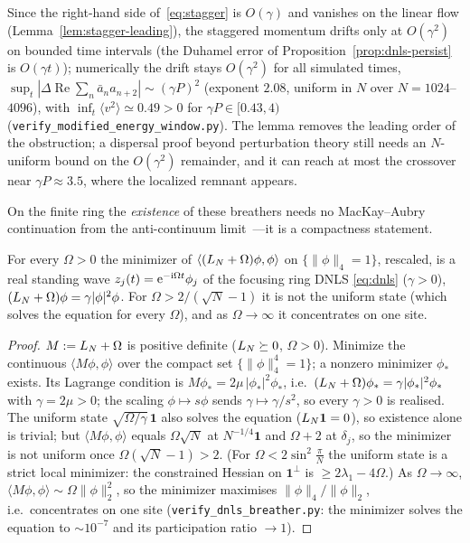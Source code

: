 \noindent Since the right-hand side of~\eqref{eq:stagger} is $O(\gamma)$ and vanishes on the linear flow
(Lemma~\ref{lem:stagger-leading}), the staggered momentum drifts only at $O(\gamma^2)$ on bounded time
intervals (the Duhamel error of Proposition~\ref{prop:dnls-persist} is $O(\gamma t)$); numerically the drift
stays $O(\gamma^2)$ for all simulated times,
$\sup_t|\Delta\!\operatorname{Re}\!\sum_n\bar a_na_{n+2}|\sim(\gamma P)^2$ (exponent $2.08$, uniform in $N$
over $N=1024$--$4096$), with $\inf_t\langle v^2\rangle\simeq0.49>0$ for $\gamma P\in[0.43,4)$
(\texttt{verify\_modified\_energy\_window.py}). The lemma removes the leading order of the obstruction;
a dispersal proof beyond perturbation theory still needs an $N$-uniform bound on the $O(\gamma^2)$ remainder,
and it can reach at most the crossover near $\gamma P\approx3.5$, where the localized remnant appears.

On the finite ring the \emph{existence} of these breathers needs no MacKay--Aubry continuation from the
anti-continuum limit~\cite{MacKayAubry}---it is a compactness statement.

\begin{proposition}\label{prop:breather}
For every $\Omega>0$ the minimizer of $\langle(L_N+\Omega)\phi,\phi\rangle$ on $\{\|\phi\|_4=1\}$, rescaled,
is a real standing wave $z_j(t)=\mathrm{e}^{-\mathrm i\Omega t}\phi_j$ of the focusing ring DNLS \eqref{eq:dnls}
($\gamma>0$), $(L_N+\Omega)\phi=\gamma|\phi|^2\phi$. For $\Omega>2/(\sqrt N-1)$ it is not the uniform state
(which solves the equation for every $\Omega$), and as $\Omega\to\infty$ it concentrates on one site.
\end{proposition}

\begin{proof}
$M:=L_N+\Omega$ is positive definite ($L_N\succeq0$, $\Omega>0$). Minimize the continuous $\langle
M\phi,\phi\rangle$ over the compact set $\{\|\phi\|_4^4=1\}$; a nonzero minimizer $\phi_\ast$ exists. Its
Lagrange condition is $M\phi_\ast=2\mu\,|\phi_\ast|^2\phi_\ast$, i.e.\ $(L_N+\Omega)\phi_\ast=\gamma|\phi_\ast|^2\phi_\ast$
with $\gamma=2\mu>0$; the scaling $\phi\mapsto s\phi$ sends $\gamma\mapsto\gamma/s^2$, so every $\gamma>0$ is
realised. The uniform state $\sqrt{\Omega/\gamma}\,\mathbf 1$ also solves the equation ($L_N\mathbf1=0$), so
existence alone is trivial; but $\langle M\phi,\phi\rangle$ equals $\Omega\sqrt N$ at $N^{-1/4}\mathbf 1$ and
$\Omega+2$ at $\delta_{j}$, so the minimizer is not uniform once $\Omega(\sqrt N-1)>2$. (For
$\Omega<2\sin^2\frac\pi N$ the uniform state is a strict local minimizer: the constrained Hessian on
$\mathbf 1^\perp$ is $\ge2\lambda_1-4\Omega$.) As $\Omega\to\infty$, $\langle M\phi,\phi\rangle\sim\Omega\|\phi\|_2^2$,
so the minimizer maximises $\|\phi\|_4/\|\phi\|_2$, i.e.\ concentrates on one site
(\texttt{verify\_dnls\_breather.py}: the minimizer solves the equation to $\sim\!10^{-7}$ and its participation
ratio $\to1$). \end{proof}

